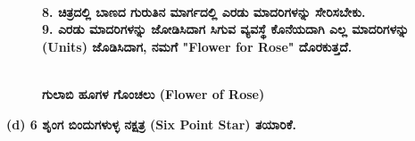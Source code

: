 \begin{figure}[H]
\\
\textbf{8. ಚಿತ್ರದಲ್ಲಿ ಬಾಣದ ಗುರುತಿನ ಮಾರ್ಗದಲ್ಲಿ ಎರಡು ಮಾದರಿಗಳನ್ನು ಸೇರಿಸಬೇಕು.}\\
\textbf{9. ಎರಡು ಮಾದರಿಗಳನ್ನು ಜೋಡಿಸಿದಾಗ ಸಿಗುವ ವ್ಯವಸ್ಥೆ ಕೊನೆಯದಾಗಿ ಎಲ್ಲ ಮಾದರಿಗಳನ್ನು (Units) ಜೊಡಿಸಿದಾಗ, ನಮಗೆ "Flower for Rose" ದೊರಕುತ್ತದೆ.}
\end{figure}
\begin{figure}[H]
\\
\textbf{ಗುಲಾಬಿ ಹೂಗಳ ಗೊಂಚಲು (Flower of Rose)}
\end{figure}


\noindent
\textbf{(d) 6 ಶೃಂಗ ಬಿಂದುಗಳುಳ್ಳ ನಕ್ಷತ್ರ (Six Point Star) ತಯಾರಿಕೆ.}

